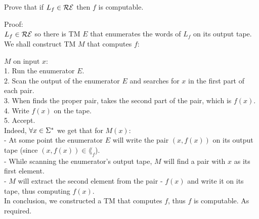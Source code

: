 Prove that if $L_f \in \mathcal{R}\mathcal{E}$ then $f$ is computable.

Proof: \\
$L_f \in \mathcal{R}\mathcal{E}$ so there is TM $E$ that enumerates the words of $L_f$ on its output tape. \\
We shall construct TM $M$ that computes $f$:

$M \text{ on input } x$: \\
1. Run the enumerator $E$. \\
2. Scan the output of the enumerator $E$ and searches for $x$ in the first part of each pair. \\
3. When finds the proper pair, takes the second part of the pair, which is $f(x)$. \\
4. Write $f(x)$ on the tape. \\
5. Accept. \\

Indeed, $\forall x \in \Sigma^*$ we get that for $M(x)$: \\
- At some point the enumerator $E$ will write the pair $(x, f(x))$ on its
output tape (since $(x, f(x)) \in \lang_f$). \\
- While scanning the enumerator's output tape, $M$ will find a pair with $x$ as its first element. \\
- $M$ will extract the second element from the pair - $f(x)$ and write it on its tape,
thus computing $f(x)$. \\

In conclusion, we constructed a TM that computes $f$, thus $f$ is computable. As required. \\

